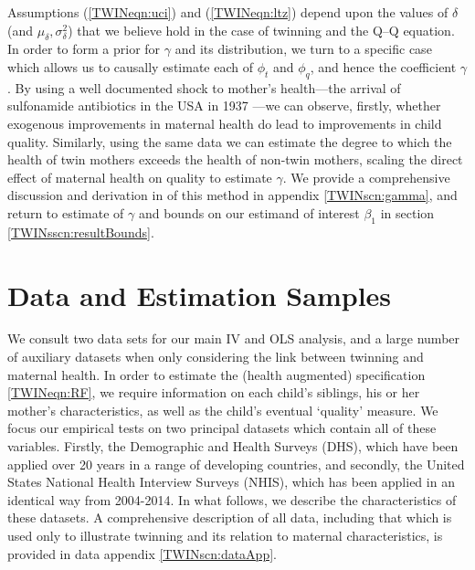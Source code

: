 Assumptions (\ref{TWINeqn:uci}) and (\ref{TWINeqn:ltz}) depend upon the values
of $\delta$ (and $\mu_\delta,\sigma^2_\delta$) that we believe hold in the case 
of twinning and the Q--Q equation.  In order to form a prior for $\gamma$ and its
distribution, we turn to a specific case which allows us to causally estimate 
each of $\phi_t$ and $\phi_q$, and hence the coefficient $\gamma$.  By using a 
well documented shock to mother's health---the arrival of sulfonamide antibiotics 
in the USA in 1937 \citep{BhalotraVenkataramani2014,Jayachandranetal2010}---we 
can observe, firstly, whether exogenous improvements in maternal health do lead
to improvements in child quality.  Similarly, using the same data we can estimate
the degree to which the health of twin mothers exceeds the health of non-twin 
mothers, scaling the direct effect of maternal health on quality to estimate 
$\gamma$.  We provide a comprehensive discussion and derivation in of this method 
in appendix \ref{TWINscn:gamma}, and return to estimate of $\gamma$ and bounds on 
our estimand of interest $\beta_1$ in section \ref{TWINsscn:resultBounds}.


\section{Data and Estimation Samples}              \label{TWINscn:data}
We consult two data sets for our main IV and OLS analysis, and a large number of
auxiliary datasets when only considering the link between twinning and maternal
health.  In order to estimate the (health augmented) specification 
\ref{TWINeqn:RF}, we require information on each child's siblings, his or her
mother's characteristics, as well as the child's eventual `quality' measure. 
We focus our empirical tests on two principal datasets which contain all of 
these variables.  Firstly, the Demographic and Health Surveys (DHS), which have 
been applied over 20 years in a range of developing countries, and secondly, the 
United States National Health Interview Surveys (NHIS), which has been applied 
in an identical way from 2004-2014.  In what follows, we describe the 
characteristics of these datasets.  A comprehensive description of all data, 
including that which is used only to illustrate twinning and its relation to 
maternal characteristics, is provided in data appendix \ref{TWINscn:dataApp}.

